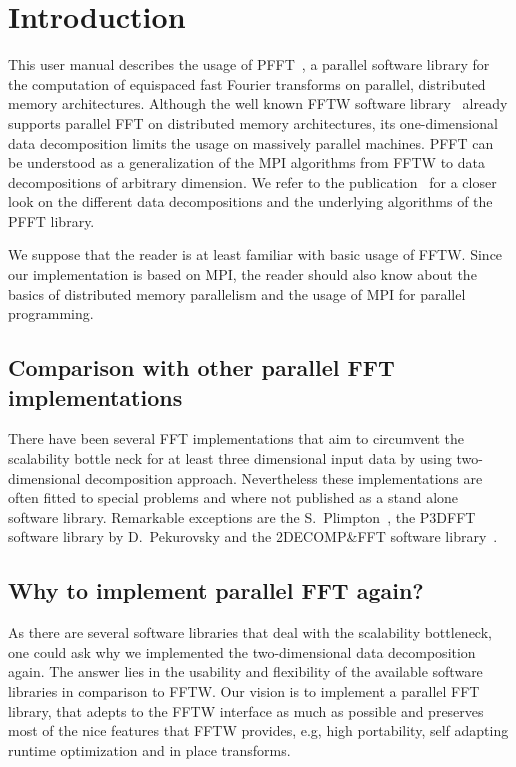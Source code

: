 \chapter{Introduction}\label{chap:intro}
This user manual describes the usage of PFFT~\pfftversion, a parallel software library for the
computation of equispaced fast Fourier transforms on parallel, distributed memory architectures.
Although the well known FFTW software library~\cite{fftw, FFTW05} already supports parallel FFT
on distributed memory architectures, its one-dimensional data decomposition limits the usage on
massively parallel machines. PFFT can be understood as a generalization of the MPI algorithms
from FFTW to data decompositions of arbitrary dimension.
We refer to the publication~\cite{Pi13} for a closer look on the
different data decompositions and the underlying algorithms of the PFFT library.



We suppose that the reader is at least familiar with basic usage of FFTW. Since our implementation is based on
MPI, the reader should also know about the basics of distributed memory parallelism and the usage of MPI for parallel
programming.




\section{Comparison with other parallel FFT implementations}

There have been several FFT implementations that aim to circumvent the scalability bottle neck
for at least three dimensional input data by using two-dimensional decomposition approach.
Nevertheless these implementations are often fitted to special problems and where not published
as a stand alone software library. Remarkable exceptions are the S.~Plimpton~\cite{libsandiafft},
the P3DFFT~\cite{libp3dfft} software library by D.~Pekurovsky and the \mbox{2DECOMP\&FFT} software library~\cite{Li2010, lib2decompfft}.



\section{Why to implement parallel FFT again?}
As there are several software libraries that deal with the scalability bottleneck, one could ask why we implemented the two-dimensional data decomposition again.
The answer lies in the usability and flexibility of the available software libraries in comparison to FFTW.
Our vision is to implement a parallel FFT library, that adepts to the FFTW interface as much as possible
and preserves most of the nice features that FFTW provides, e.g, high portability, self adapting runtime optimization and in place transforms.

